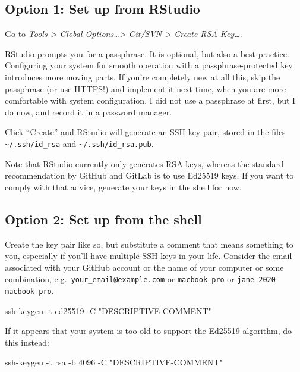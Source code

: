 \documentclass[
]{book}
\newenvironment{Shaded}{\begin{snugshade}}{\end{snugshade}}
\newcommand{\NormalTok}[1]{#1}
\begin{document}
\subsection{Option 1: Set up from RStudio}\label{option-1-set-up-from-rstudio}

Go to \emph{Tools \textgreater{} Global Options\ldots\textgreater{} Git/SVN \textgreater{} Create RSA Key\ldots{}}.

RStudio prompts you for a passphrase. It is optional, but also a best practice. Configuring your system for smooth operation with a passphrase-protected key introduces more moving parts.
If you're completely new at all this, skip the passphrase (or use HTTPS!) and implement it next time, when you are more comfortable with system configuration.
I did not use a passphrase at first, but I do now, and record it in a password manager.

Click ``Create'' and RStudio will generate an SSH key pair, stored in the files \texttt{\textasciitilde{}/.ssh/id\_rsa} and \texttt{\textasciitilde{}/.ssh/id\_rsa.pub}.

Note that RStudio currently only generates RSA keys, whereas the standard recommendation by GitHub and GitLab is to use Ed25519 keys.
If you want to comply with that advice, generate your keys in the shell for now.

\subsection{Option 2: Set up from the shell}\label{option-2-set-up-from-the-shell}

Create the key pair like so, but substitute a comment that means something to you, especially if you'll have multiple SSH keys in your life.
Consider the email associated with your GitHub account or the name of your computer or some combination, e.g.~\texttt{your\_email@example.com} or \texttt{macbook-pro} or \texttt{jane-2020-macbook-pro}.

\begin{Shaded}
\begin{Highlighting}[]
\NormalTok{ssh{-}keygen {-}t ed25519 {-}C "DESCRIPTIVE{-}COMMENT"}
\end{Highlighting}
\end{Shaded}

If it appears that your system is too old to support the Ed25519 algorithm, do this instead:

\begin{Shaded}
\begin{Highlighting}[]
\NormalTok{ssh{-}keygen {-}t rsa {-}b 4096 {-}C "DESCRIPTIVE{-}COMMENT"}
\end{Highlighting}
\end{Shaded}
\end{document}
